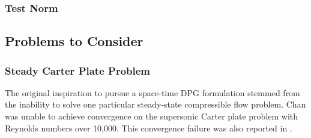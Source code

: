 \documentclass[Proposal.tex]{subfiles}
\begin{document}
\subsubsection{Test Norm}

\subsection{Problems to Consider}
\subsubsection{Steady Carter Plate Problem}
The original inspiration to pursue a space-time DPG formulation stemmed from the inability to solve one particular steady-state compressible flow problem.
Chan\cite{JesseDissertation} was unable to achieve convergence on the supersonic Carter plate problem\cite{Carter1973} with Reynolds numbers over 10,000.
This convergence failure was also reported in \cite{KirkDissertation}.
\end{document}
